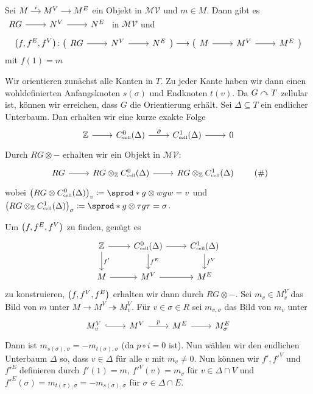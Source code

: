 \begin{lemma}
	Sei \(
		\begin{tikzcd}[cramped,sep=small]
			M \rar["i"] & M^V \rar & M^E
		\end{tikzcd}
	\) ein Objekt in $\mathcal{MV}$ und $m \in M$.
	Dann gibt es \(
		\begin{tikzcd}
			R G \rar & N^V \rar & N^E
		\end{tikzcd}
	\) in $\mathcal{MV}$ und 
	\[
		\enbrace*{f,f^E, f^V} \colon \big( \begin{tikzcd}
			R G \rar & N^V \rar & N^E
		\end{tikzcd}\big) \longrightarrow \big(\begin{tikzcd}
			M \rar & M^V \rar & M^E
		\end{tikzcd} \big)
	\]
	mit $f(1)=m$
\end{lemma}
\begin{beweis}
	Wir orientieren zunächst alle Kanten in $T$.
	Zu jeder Kante haben wir dann einen wohldefinierten Anfangsknoten $s(\sigma)$ und Endknoten $t(v)$.
	Da $G \acts T$ zellular ist, können wir erreichen, dass $G$ die Orientierung erhält.
	Sei $\Delta \subseteq T$ ein endlicher Unterbaum.
	Dan erhalten wir eine kurze exakte Folge
	\[
		\begin{tikzcd}
			\mathbb{Z} \rar & C^0_\cell(\Delta) \rar["\partial"] & C_\cell^1(\Delta) \rar & 0
		\end{tikzcd}
	\]
	Durch $RG \otimes -$ erhalten wir ein Objekt in $\mathcal{MV}$:
	\begin{equation}
		\begin{tikzcd}
			RG \rar & RG \otimes_\mathbb{Z} C_\cell^0(\Delta) \rar & RG \otimes_\mathbb{Z} C_\cell^1(\Delta) 
		\end{tikzcd}
		\label{eq:lem:MV} \tag{\#}
	\end{equation}
	wobei $\enbrace*{RG \otimes C_\cell^0(\Delta)}_v \coloneqq \sprod*{g \otimes w}{g w = v}$ und $\enbrace*{RG \otimes_\mathbb{Z} C_\cell^1(\Delta)}_\sigma \coloneqq \sprod*{g \otimes \tau }{g \tau = \sigma}$.
	
	Um $\enbrace*{f, f^E,f^V}$ zu finden, genügt es
	\[
		\begin{tikzcd}
			\mathbb{Z} \dar["f'"] \rar & C^0_\cell(\Delta) \dar["f^E"] \rar & C^1_\cell(\Delta) \dar["f^V"] \\
			M \rar & M^V \rar & M^E
		\end{tikzcd}
	\]
	zu konstruieren, $\enbrace*{f,f^V,f^E}$ erhalten wir dann durch $RG \otimes -$.
	Sei $m_v \in M^V_v$ das Bild von $m$ unter $M \to M^V \twoheadrightarrow M^V_v$.
	Für $v \in \sigma \in R$ sei $m_{v,\sigma}$ das Bild von $m_v$ unter 
	\[
		\begin{tikzcd}
			M^V_v \rar[hook] & M^V \rar["p"] &  M^E \rar & M^E_\sigma
		\end{tikzcd}
	\]
	Dann ist $m_{s(\sigma),\sigma} = - m_{t(\sigma),\sigma}$ (da $p \circ  i = 0$ ist).
	Nun wählen wir den endlichen Unterbaum $\Delta$ so, dass $v \in \Delta$ für alle $v$ mit $m_v\neq 0$.
	Nun können wir $f',{f'}^V$ und ${f'}^E$ definieren durch $f'(1) = m$, ${f'}^V(v) = m_v $ für $v \in  \Delta \cap V$ und ${f'}^E(\sigma) = m_{t(\sigma),\sigma} = - m_{s(\sigma),\sigma}$ für $\sigma \in  \Delta \cap E$.
\end{beweis}
